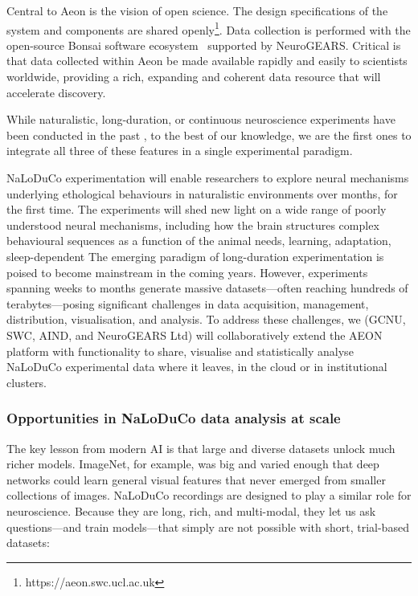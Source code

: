 Central to Aeon is the vision of open science. The design specifications of the
system and components are shared openly\footnote{https://aeon.swc.ucl.ac.uk}.
Data collection is performed with the open-source Bonsai software
ecosystem~\citep{lopesEtAl15} supported by NeuroGEARS. Critical is that data
collected within Aeon be made available rapidly and easily to scientists
worldwide, providing a rich, expanding and coherent data resource that will
accelerate discovery.

While naturalistic, long-duration, or continuous neuroscience experiments have
been conducted in the past
\citep{nagyEtAl23,hoEtAl23,rayEtAl25,weissbrodEtAl13,dhawaleEtAl17,newmanEtAl25},
to the best of our knowledge, we are the first ones to integrate all three of
these features in a single experimental paradigm.
%

NaLoDuCo experimentation will enable researchers to explore neural mechanisms
underlying ethological behaviours in naturalistic environments over months, for
the first time.  The experiments will shed new light on a wide range of poorly
understood neural mechanisms, including how the brain structures complex
behavioural sequences as a function of the animal needs, learning, adaptation,
sleep-dependent
%
The emerging paradigm of long-duration experimentation is poised to become
mainstream in the coming years.
%
However, experiments spanning weeks to months generate massive datasets—often
reaching hundreds of terabytes—posing significant challenges in data
acquisition, management, distribution, visualisation, and analysis.
%
To address these challenges, we (GCNU, SWC, AIND, and NeuroGEARS Ltd) will
collaboratively extend the AEON platform with functionality to share, visualise
and statistically analyse NaLoDuCo experimental data where it leaves, in the
cloud or in institutional clusters.

\subsubsection{Opportunities in NaLoDuCo data analysis at scale}

The key lesson from modern AI is that large and diverse datasets unlock much richer models.
ImageNet, for example, was big and varied enough that deep networks could learn general visual
features that never emerged from smaller collections of images. NaLoDuCo recordings are designed
to play a similar role for neuroscience. Because they are long, rich, and multi-modal, they let us
ask questions---and train models---that simply are not possible with short, trial-based datasets:

